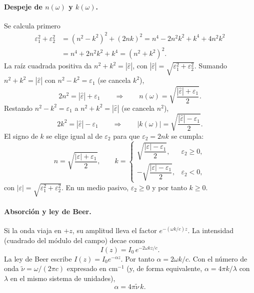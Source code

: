 \paragraph{Despeje de $n(\omega)$ y $k(\omega)$.}
Se calcula primero
\begin{align}
\varepsilon_1^{2}+\varepsilon_2^{2}
&=(n^{2}-k^{2})^{2}+(2nk)^{2}
=n^{4}-2n^{2}k^{2}+k^{4}+4n^{2}k^{2}\\
&=n^{4}+2n^{2}k^{2}+k^{4}
=(n^{2}+k^{2})^{2}.
\end{align}
La ra\'iz cuadrada positiva da $n^{2}+k^{2}=|\hat\varepsilon|$, con $|\hat\varepsilon|=\sqrt{\varepsilon_1^{2}+\varepsilon_2^{2}}$.
Sumando $n^{2}+k^{2}=|\hat\varepsilon|$ con $n^{2}-k^{2}=\varepsilon_1$ (se cancela $k^{2}$),
\begin{equation}
2n^{2}=|\hat\varepsilon|+\varepsilon_1
\qquad\Longrightarrow\qquad
n(\omega)=\sqrt{\frac{|\hat\varepsilon|+\varepsilon_1}{2}}.
\end{equation}
Restando $n^{2}-k^{2}=\varepsilon_1$ a $n^{2}+k^{2}=|\hat\varepsilon|$ (se cancela $n^{2}$),
\begin{equation}
2k^{2}=|\hat\varepsilon|-\varepsilon_1
\qquad\Longrightarrow\qquad
|k(\omega)|=\sqrt{\frac{|\hat\varepsilon|-\varepsilon_1}{2}}.
\end{equation}
El signo de $k$ se elige igual al de $\varepsilon_2$ para que $\varepsilon_2=2nk$ se cumpla:
\begin{equation}
\label{eq:nk-from-eps}
n=\sqrt{\frac{|\varepsilon|+\varepsilon_1}{2}},\qquad
k=\begin{cases}
\sqrt{\dfrac{|\varepsilon|-\varepsilon_1}{2}},&\varepsilon_2\ge 0,\\[4pt]
-\sqrt{\dfrac{|\varepsilon|-\varepsilon_1}{2}},&\varepsilon_2<0,
\end{cases}
\end{equation}
con $|\varepsilon|=\sqrt{\varepsilon_1^{2}+\varepsilon_2^{2}}$.
En un medio pasivo, $\varepsilon_2\ge 0$ y por tanto $k\ge 0$.

\paragraph{Absorci\'on y ley de Beer.}
Si la onda viaja en $+z$, su amplitud lleva el factor $e^{-(\omega k/c)z}$.
La intensidad (cuadrado del m\'odulo del campo) decae como
\begin{equation}
I(z)=I_{0}\,e^{-2\omega k z/c}.
\end{equation}
La ley de Beer escribe $I(z)=I_{0}e^{-\alpha z}$. Por tanto $\alpha=2\omega k/c$.
Con el n\'umero de onda $\tilde\nu=\omega/(2\pi c)$ expresado en cm$^{-1}$
(y, de forma equivalente, $\alpha=4\pi k/\lambda$ con $\lambda$ en el mismo sistema de unidades),
\begin{equation}
\label{eq:alpha}
\alpha=4\pi\tilde\nu\,k.
\end{equation}

